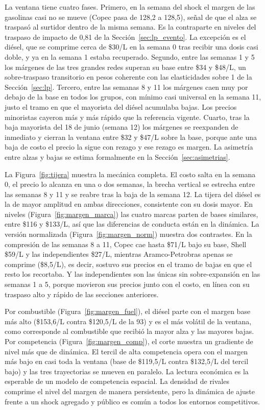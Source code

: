 \documentclass[11pt]{article}
\begin{document}
La ventana tiene cuatro fases. Primero, en la semana del shock el margen de
las gasolinas casi no se mueve (Copec pasa de 128,2 a 128,5), señal de que
el alza se traspasó al surtidor dentro de la misma semana. Es la contraparte
en niveles del traspaso de impacto de 0,81 de la
Sección~\ref{sec:lp_evento}. La excepción es el diésel, que se comprime
cerca de \$30/L en la semana 0 tras recibir una dosis casi doble, y ya en la
semana 1 estaba recuperado. Segundo, entre las semanas 1 y 5 los márgenes de
las tres grandes redes superan su base entre \$34 y \$48/L, un
sobre-traspaso transitorio en pesos coherente con las elasticidades sobre 1
de la Sección~\ref{sec:lp}. Tercero, entre las semanas 8 y 11 los márgenes
caen muy por debajo de la base en todos los grupos, con mínimo casi
universal en la semana 11, justo el tramo en que el mayorista del diésel
acumulaba bajas. Los precios minoristas cayeron más y más rápido que la
referencia vigente. Cuarto, tras la baja mayorista del 18 de junio (semana
12) los márgenes se reexpanden de inmediato y cierran la ventana entre \$32
y \$47/L sobre la base, porque ante una baja de costo el precio la sigue con
rezago y ese rezago es margen. La asimetría entre alzas y bajas se estima
formalmente en la Sección~\ref{sec:asimetrias}.

La Figura~\ref{fig:tijera} muestra la mecánica completa. El costo salta en
la semana 0, el precio lo alcanza en una o dos semanas, la brecha vertical
se estrecha entre las semanas 8 y 11 y se reabre tras la baja de la semana
12. La tijera del diésel es la de mayor amplitud en ambas direcciones,
consistente con su dosis mayor. En niveles
(Figura~\ref{fig:margen_marca}) las cuatro marcas parten de bases similares,
entre \$116 y \$133/L, así que las diferencias de conducta están en la
dinámica. La versión normalizada (Figura~\ref{fig:margen_norm}) muestra dos
contrastes. En la compresión de las semanas 8 a 11, Copec cae hasta \$71/L
bajo su base, Shell \$59/L y las independientes \$27/L, mientras
Aramco-Petrobras apenas se comprime (\$8,5/L), es decir, sostuvo sus precios
en el tramo de bajas en que el resto los recortaba. Y las independientes son
las únicas sin sobre-expansión en las semanas 1 a 5, porque movieron sus
precios junto con el costo, en línea con su traspaso alto y rápido de las
secciones anteriores.

Por combustible (Figura~\ref{fig:margen_fuel}), el diésel parte con el
margen base más alto (\$153,6/L contra \$120,5/L de la 93) y es el más
volátil de la ventana, como corresponde al combustible que recibió la mayor
alza y las mayores bajas. Por competencia
(Figura~\ref{fig:margen_comp}), el corte muestra un gradiente de nivel más
que de dinámica. El tercil de alta competencia opera con el margen más bajo
en casi toda la ventana (base de \$119,5/L contra \$132,5/L del tercil bajo)
y las tres trayectorias se mueven en paralelo. La lectura económica es la
esperable de un modelo de competencia espacial. La densidad de rivales
comprime el nivel del margen de manera persistente, pero la dinámica de
ajuste frente a un shock agregado y público es común a todos los entornos
competitivos.
\end{document}
